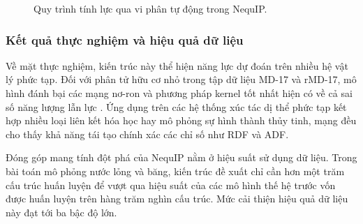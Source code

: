 \begin{figure}[H]
\centering
{}
\caption{Quy trình tính lực qua vi phân tự động trong NequIP.}
\label{fig:nequip-autograd}
\end{figure}


\subsubsection{Kết quả thực nghiệm và hiệu quả dữ liệu}

Về mặt thực nghiệm, kiến trúc này thể hiện năng lực dự đoán trên nhiều hệ vật lý phức tạp. Đối với phân tử hữu cơ nhỏ trong tập dữ liệu MD-17 và rMD-17, mô hình đánh bại các mạng nơ-ron và phương pháp kernel tốt nhất hiện có về cả sai số năng lượng lẫn lực \cite{batzner2022nequip}. Ứng dụng trên các hệ thống xúc tác dị thể phức tạp kết hợp nhiều loại liên kết hóa học hay mô phỏng sự hình thành thủy tinh, mạng đều cho thấy khả năng tái tạo chính xác các chỉ số như RDF và ADF.

Đóng góp mang tính đột phá của NequIP nằm ở hiệu suất sử dụng dữ liệu. Trong bài toán mô phỏng nước lỏng và băng, kiến trúc đề xuất chỉ cần hơn một trăm cấu trúc huấn luyện để vượt qua hiệu suất của các mô hình thế hệ trước vốn được huấn luyện trên hàng trăm nghìn cấu trúc. Mức cải thiện hiệu quả dữ liệu này đạt tới ba bậc độ lớn.


